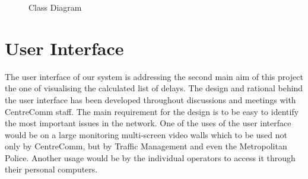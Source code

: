 \begin{figure}
	\caption{Class Diagram}
\label{fig:class}
\end{figure}

\FloatBarrier
\section{User Interface}
The user interface of our system is addressing the second main aim of this project the one of visualising the calculated list of delays. The design and rational behind the user interface has been developed throughout discussions and meetings with CentreComm staff. The main requirement for the design is to be easy to identify the most important issues in the network. One of the uses of the user interface would be on a large monitoring multi-screen video walls which to be used not only by CentreComm, but by Traffic Management and even the Metropolitan Police. Another usage would be by the individual operators to access it through their personal computers. 

